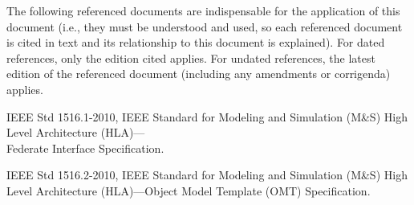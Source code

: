 \setlength{\parskip}{12pt}%

The following referenced documents are indispensable for the application of this document (i.e., they must be understood and used, so each referenced document is cited in text and its relationship to this document is explained). For dated references, only the edition cited applies. For undated references, the latest edition of the referenced document (including any amendments or corrigenda) applies.

IEEE Std 1516.1-2010, IEEE Standard for Modeling and Simulation (M\&S) High Level Architecture (HLA)---\\
Federate Interface Specification.

IEEE Std 1516.2-2010, IEEE Standard for Modeling and Simulation (M\&S) High Level Architecture (HLA)---Object Model Template (OMT) Specification.
